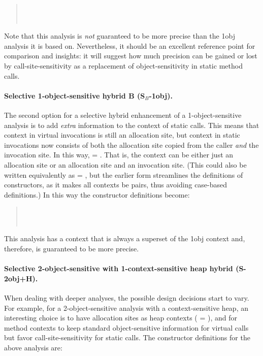 \begin{quote}
 \\
 \\
\end{quote}

Note that this analysis is \emph{not} guaranteed to be more precise than the 1obj analysis it is based on. Nevertheless, it should be an excellent reference point for comparison and insights: it will suggest how much precision can be gained or lost by call-site-sensitivity as a replacement of object-sensitivity in static method calls.

\paragraph[Selective 1-object-sensitive (-B)]{Selective 1-object-sensitive hybrid B (S$_B$-1obj).}
The second option for a selective hybrid enhancement of a 1-object-sensitive analysis is to add \emph{extra} information to the context of static calls. This means that context in virtual invocations is still an allocation site, but context in static invocations now consists of both the allocation site copied from the caller \emph{and} the invocation site. In this way,  = . That is, the context can be either just an allocation site or an allocation site and an invocation site. (This could also be written equivalently as  = , but the earlier form streamlines the definitions of constructors, as it makes all contexts be pairs, thus avoiding case-based definitions.)  In this way the constructor definitions become:

\begin{quote}
 \\
 \\
\end{quote}

This analysis has a context that is always a superset of the 1obj context and, therefore, is guaranteed to be more precise.

\paragraph[Selective 2-object-sensitive with 1-context-sensitive heap]{Selective 2-object-sensitive with 1-context-sensitive heap hybrid (S-2obj+H).}
When dealing with deeper analyses, the possible design decisions start to vary. For example, for a 2-object-sensitive analysis with a context-sensitive heap, an interesting choice is to have allocation sites as heap contexts ( = ), and for method contexts to keep standard object-sensitive information for virtual calls but favor call-site-sensitivity for static calls. The constructor definitions for the above analysis are:

